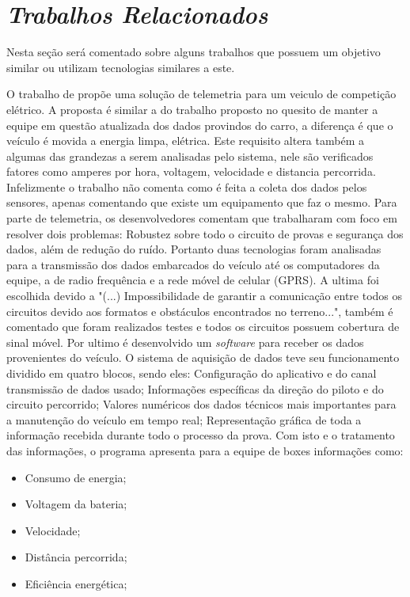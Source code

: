 \chapter{\textit{Trabalhos Relacionados}}
	\label{ch:trabalhos}
Nesta seção será comentado sobre alguns trabalhos que possuem um objetivo similar ou utilizam tecnologias similares a este. 

O trabalho de \cite{gprsTelemetrySystem2013} propõe uma solução de telemetria para um veiculo de competição elétrico. A proposta é similar a do trabalho proposto no quesito de manter a equipe em questão atualizada dos dados provindos do carro, a diferença é que o veículo é movida a energia limpa, elétrica. Este requisito altera também a algumas das grandezas a serem analisadas pelo sistema, nele são verificados fatores como amperes por hora, voltagem, velocidade e distancia percorrida. Infelizmente o trabalho não comenta como é feita a coleta dos dados pelos sensores, apenas comentando que existe um equipamento que faz o mesmo. Para parte de telemetria, os desenvolvedores comentam que trabalharam com foco em resolver dois problemas: Robustez sobre todo o circuito de provas e segurança dos dados, além de redução do ruído. Portanto duas tecnologias foram analisadas para a transmissão dos dados embarcados do veículo até os computadores da equipe, a de radio frequência e a rede móvel de celular (GPRS). A ultima foi escolhida devido a "(...) Impossibilidade de garantir a comunicação entre todos os circuitos devido aos formatos e obstáculos encontrados no terreno...", também é comentado que foram realizados testes e todos os circuitos possuem cobertura de sinal móvel. Por ultimo é desenvolvido um \textit{software} para receber os dados provenientes do veículo. O sistema de aquisição de dados teve seu funcionamento dividido em quatro blocos, sendo eles: Configuração do aplicativo e do canal transmissão de dados usado; Informações específicas da direção do piloto e do circuito percorrido; Valores numéricos dos dados técnicos mais importantes para a manutenção do veículo em tempo real; Representação gráfica de toda a informação recebida durante todo o processo da prova. Com isto e o tratamento das informações, o programa apresenta para a equipe de boxes informações como:

\begin{itemize}
	\item Consumo de energia; 
	\item Voltagem da bateria;
	\item Velocidade;
	\item Distância percorrida;
	\item Eficiência energética; 
\end{itemize}

